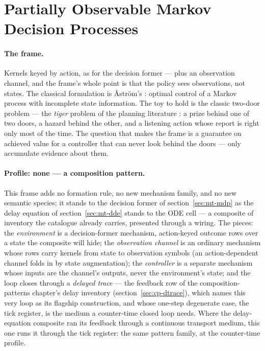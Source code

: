 \section{Partially Observable Markov Decision Processes}
\label{sec:mt-pomdp}

\paragraph{The frame.} Kernels keyed by action, as for the decision
former --- plus an observation channel, and the frame's whole point
is that the policy sees observations, not states.  The classical
formulation is {\AA}str{\"o}m's \cite{astrom-1965}: optimal control
of a Markov process with incomplete state information.  The toy to
hold is the classic two-door problem --- the \emph{tiger} problem of
the planning literature \cite{kaelbling-littman-cassandra-1998}: a
prize behind one of two doors, a hazard behind the other, and a
listening action whose report is right only most of the time.  The question that makes the frame is
a guarantee on achieved value for a controller that can never look
behind the doors --- only accumulate evidence about them.

\paragraph{Profile: none --- a composition pattern.} This frame adds
no formation rule, no new mechanism family, and no new semantic
species; it stands to the decision former of section~\ref{sec:mt-mdp}
as the delay equation of section~\ref{sec:mt-dde} stands to the ODE
cell --- a composite of inventory the catalogue already carries,
presented through a wiring.  The pieces: the \emph{environment} is a
decision-former mechanism, action-keyed outcome rows over a state the
composite will hide; the \emph{observation channel} is an ordinary
mechanism whose rows carry kernels from state to observation symbols
(an action-dependent channel folds in by state augmentation); the
\emph{controller} is a separate mechanism whose inputs are the
channel's outputs, never the environment's state; and the loop closes
through a \emph{delayed trace} --- the feedback row of the
composition-patterns chapter's delay inventory
(section~\ref{sec:cp-dtrace}), which names this very loop as its
flagship construction, and whose one-step degenerate case, the tick
register, is the medium a counter-time closed loop needs.  Where
the delay-equation composite ran its feedback through a continuous
transport medium, this one runs it through the tick register: the
same pattern family, at the counter-time profile.

